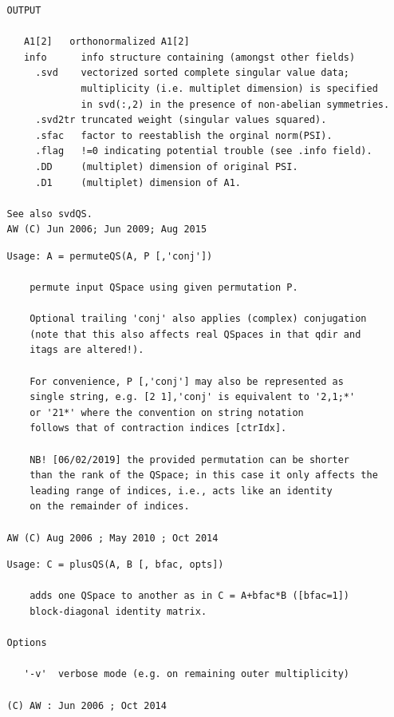 \documentclass[twoside,12pt]{article}
\begin{document}
\begin{verbatim}
   OUTPUT
 
      A1[2]   orthonormalized A1[2]
      info      info structure containing (amongst other fields)
        .svd    vectorized sorted complete singular value data;
                multiplicity (i.e. multiplet dimension) is specified
                in svd(:,2) in the presence of non-abelian symmetries.
        .svd2tr truncated weight (singular values squared).
        .sfac   factor to reestablish the orginal norm(PSI).
        .flag   !=0 indicating potential trouble (see .info field).
        .DD     (multiplet) dimension of original PSI.
        .D1     (multiplet) dimension of A1.
 
   See also svdQS.
   AW (C) Jun 2006; Jun 2009; Aug 2015
\end{verbatim}

\pagebreak[3]



\begin{verbatim}
   Usage: A = permuteQS(A, P [,'conj'])
 
       permute input QSpace using given permutation P.
 
       Optional trailing 'conj' also applies (complex) conjugation
       (note that this also affects real QSpaces in that qdir and
       itags are altered!).
 
       For convenience, P [,'conj'] may also be represented as
       single string, e.g. [2 1],'conj' is equivalent to '2,1;*'
       or '21*' where the convention on string notation
       follows that of contraction indices [ctrIdx].
 
       NB! [06/02/2019] the provided permutation can be shorter
       than the rank of the QSpace; in this case it only affects the
       leading range of indices, i.e., acts like an identity
       on the remainder of indices.
 
   AW (C) Aug 2006 ; May 2010 ; Oct 2014
\end{verbatim}

\pagebreak[3]



\begin{verbatim}
   Usage: C = plusQS(A, B [, bfac, opts])
 
       adds one QSpace to another as in C = A+bfac*B ([bfac=1])
       block-diagonal identity matrix.
 
   Options
 
      '-v'  verbose mode (e.g. on remaining outer multiplicity)
 
   (C) AW : Jun 2006 ; Oct 2014
\end{verbatim}
\end{document}
